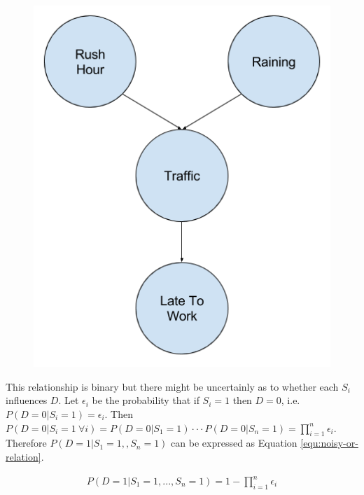 \begin{minipage}[t]{0.35\textwidth}
\vspace{0px}
\begin{figure}[H]
	\centering
	\begin{minipage}[b]{1.0\textwidth}
		\includegraphics[width=\textwidth]{bayesian-network-example.png}
		\caption{}
		\label{fig:bayesian-network-example}
	\end{minipage}
	\hfill
\end{figure}
\end{minipage}

This relationship is binary but there might be uncertainly as to whether each $S_i$ influences $D$. Let $\epsilon_i$ be the probability that if $S_i = 1$ then $D = 0$, i.e. $P(D = 0|S_i = 1) = \epsilon_i$. Then $P(D = 0 | S_i = 1\ \forall i) = P(D = 0 | S_1 = 1) \cdot \cdot \cdot P(D = 0 | S_n = 1) = \prod_{i=1}^{n} \epsilon_i$. Therefore $P(D = 1| S_1 = 1, , S_n = 1)$ can be expressed as Equation \ref{equ:noisy-or-relation}.

\begin{align}
P(D = 1 | S_1 = 1, ..., S_n = 1) = 1 - \prod^n_{i=1} \epsilon_i
\label{equ:noisy-or-relation}
\end{align}

